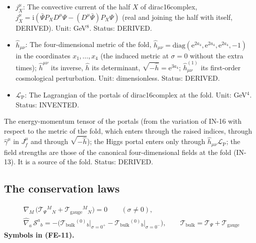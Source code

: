 \documentclass[
  10pt,
]{article}
\begin{document}
\begin{itemize}
  labels the currents that are the sources of the gauge fields. Unit:
  GeV\(^3\). Status: STANDARD.
\item
  \(j_X^\mu\): The convective current of the half \(X\) of
  dirac16complex,
  \(j_X^\mu = \mathrm{i}(\bar\Psi P_XD^\mu\Psi - (D^\mu\bar\Psi)P_X\Psi)\)
  (real and joining the half with itself, DERIVED). Unit: GeV\(^8\).
  Status: DERIVED.
\item
  \(\hat h_{\mu\nu}\): The four-dimensional metric of the fold,
  \(\hat h_{\mu\nu} = \mathrm{diag}(\mathrm{e}^{2a_4}, \mathrm{e}^{2a_4}, \mathrm{e}^{2a_4}, -1)\)
  in the coordinates \(x_1, \dots, x_4\) (the induced metric at
  \(\sigma = 0\) without the extra times); \(\hat h^{\mu\nu}\) its
  inverse, \(\hat h\) its determinant,
  \(\sqrt{-\hat h} = \mathrm{e}^{3a_4}\); \(\hat h^{(1)}_{\mu\nu}\) its
  first-order cosmological perturbation. Unit: dimensionless. Status:
  DERIVED.
\item
  \(\mathcal{L}_{\mathrm{P}}\): The Lagrangian of the portals of
  dirac16complex at the fold. Unit: GeV\(^4\). Status: INVENTED.
\end{itemize}

The energy-momentum tensor of the portals (from the variation of IN-16
with respect to the metric of the fold, which enters through the raised
indices, through \(\hat\gamma^\mu\) in \(J_f^\mu\) and through
\(\sqrt{-\hat h}\)); the Higgs portal enters only through
\(\hat h_{\mu\nu}\mathcal{L}_{\mathrm{P}}\); the field strengths are
those of the canonical four-dimensional fields at the fold (IN-13). It
is a source of the fold. Status: DERIVED.

\hypertarget{the-conservation-laws}{%
\subsection{The conservation laws}\label{the-conservation-laws}}

\[
\begin{aligned}
&\nabla_M\,\big(\mathcal{T}_\Psi{}^M{}_N + \mathcal{T}_{\mathrm{gauge}}{}^M{}_N\big) = 0\qquad (\sigma \ne 0),\\
&\hat\nabla_a\,\mathcal{S}^a{}_b = -\Big(\mathcal{T}_{\mathrm{bulk}}{}^{(0)}{}_b\big\vert_{\sigma=0^+}
 - \mathcal{T}_{\mathrm{bulk}}{}^{(0)}{}_b\big\vert_{\sigma=0^-}\Big),\qquad
 \mathcal{T}_{\mathrm{bulk}} = \mathcal{T}_\Psi + \mathcal{T}_{\mathrm{gauge}}
\end{aligned} \tag{FE-11}
\] \textbf{Symbols in (FE-11).}
\end{document}
